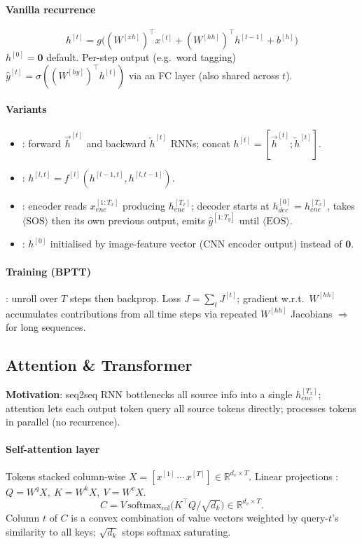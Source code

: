 \paragraph{Vanilla recurrence}
\[h^{[t]}=g\!\big((W^{[xh]})^{\top}x^{[t]}+(W^{[hh]})^{\top}h^{[t-1]}+b^{[h]}\big)\]
$h^{[0]}{=}\mathbf{0}$ default. Per-step output (e.g.\ word tagging) $\hat y^{[t]}=\sigma((W^{[hy]})^{\top}h^{[t]})$ via an FC layer (also shared across $t$).
\paragraph{Variants}
\begin{itemize}
\item {}: forward $\vec h^{[t]}$ and backward $\overleftarrow h^{[t]}$ RNNs; concat $h^{[t]}{=}[\vec h^{[t]};\overleftarrow h^{[t]}]$.
\item {}: $h^{[l,t]}{=}f^{[l]}(h^{[l-1,t]},h^{[l,t-1]})$.
\item {}: encoder reads $x_{enc}^{[1{:}T_x]}$ producing $h_{enc}^{[T_x]}$; decoder  starts at $h_{dec}^{[0]}{=}h_{enc}^{[T_x]}$, takes $\langle\text{SOS}\rangle$ then its own previous output, emits $\hat y^{[1{:}T_y]}$ until $\langle\text{EOS}\rangle$.
\item {}: $h^{[0]}$ initialised by image-feature vector (CNN encoder output) instead of $\mathbf{0}$.
\end{itemize}
\paragraph{Training (BPTT)} : unroll over $T$ steps then backprop. Loss $J{=}\sum_t J^{[t]}$; gradient w.r.t.\ $W^{[hh]}$ accumulates contributions from all time steps via repeated $W^{[hh]}$ Jacobians $\Rightarrow$  for long sequences.

\subsection{Attention \& Transformer}
\textbf{Motivation}: seq2seq RNN bottlenecks all source info into a single $h_{enc}^{[T_x]}$; attention lets each output token query all source tokens directly; processes tokens in parallel (no recurrence).
\paragraph{Self-attention layer} Tokens stacked column-wise $X{=}[x^{[1]}\,\cdots\,x^{[T]}]\!\in\!\mathbb{R}^{d_v\times T}$. Linear projections : $Q{=}W^{q}X,\ K{=}W^{k}X,\ V{=}W^{v}X$.
\[C=V\,\mathrm{softmax}_{\mathrm{col}}\!\big(K^{\top}Q/\sqrt{d_k}\big)\in\mathbb{R}^{d_v\times T}.\]
Column $t$ of $C$ is a convex combination of value vectors weighted by query-$t$'s similarity to all keys; $\sqrt{d_k}$ stops softmax saturating.
